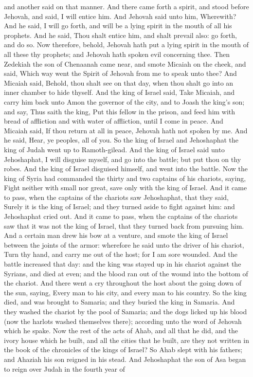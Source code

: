 and another said on that manner. And there came forth a spirit, and stood before Jehovah, and said, I will entice him. And Jehovah said unto him, Wherewith? And he said, I will go forth, and will be a lying spirit in the mouth of all his prophets. And he said, Thou shalt entice him, and shalt prevail also: go forth, and do so. Now therefore, behold, Jehovah hath put a lying spirit in the mouth of all these thy prophets; and Jehovah hath spoken evil concerning thee.  Then Zedekiah the son of Chenaanah came near, and smote Micaiah on the cheek, and said, Which way went the Spirit of Jehovah from me to speak unto thee? And Micaiah said, Behold, thou shalt see on that day, when thou shalt go into an inner chamber to hide thyself. And the king of Israel said, Take Micaiah, and carry him back unto Amon the governor of the city, and to Joash the king’s son; and say, Thus saith the king, Put this fellow in the prison, and feed him with bread of affliction and with water of affliction, until I come in peace. And Micaiah said, If thou return at all in peace, Jehovah hath not spoken by me. And he said, Hear, ye peoples, all of you.  So the king of Israel and Jehoshaphat the king of Judah went up to Ramoth-gilead. And the king of Israel said unto Jehoshaphat, I will disguise myself, and go into the battle; but put thou on thy robes. And the king of Israel disguised himself, and went into the battle. Now the king of Syria had commanded the thirty and two captains of his chariots, saying, Fight neither with small nor great, save only with the king of Israel. And it came to pass, when the captains of the chariots saw Jehoshaphat, that they said, Surely it is the king of Israel; and they turned aside to fight against him: and Jehoshaphat cried out. And it came to pass, when the captains of the chariots saw that it was not the king of Israel, that they turned back from pursuing him. And a certain man drew his bow at a venture, and smote the king of Israel between the joints of the armor: wherefore he said unto the driver of his chariot, Turn thy hand, and carry me out of the host; for I am sore wounded. And the battle increased that day: and the king was stayed up in his chariot against the Syrians, and died at even; and the blood ran out of the wound into the bottom of the chariot. And there went a cry throughout the host about the going down of the sun, saying, Every man to his city, and every man to his country.  So the king died, and was brought to Samaria; and they buried the king in Samaria. And they washed the chariot by the pool of Samaria; and the dogs licked up his blood (now the harlots washed themselves there); according unto the word of Jehovah which he spake. Now the rest of the acts of Ahab, and all that he did, and the ivory house which he built, and all the cities that he built, are they not written in the book of the chronicles of the kings of Israel? So Ahab slept with his fathers; and Ahaziah his son reigned in his stead.  And Jehoshaphat the son of Asa began to reign over Judah in the fourth year of 